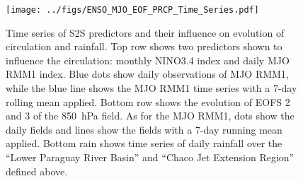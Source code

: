 \documentclass{article}
\begin{document}
\begin{figure}
  \texttt{[image: ../figs/ENSO\_MJO\_EOF\_PRCP\_Time\_Series.pdf]}
	\caption{
		Time series of S2S predictors and their influence on evolution of circulation and rainfall.
    Top row shows two predictors shown to influence the circulation: monthly NINO3.4 index and daily MJO RMM1 index.
    Blue dots show daily observations of MJO RMM1, while the blue line shows the MJO RMM1 time series with a 7-day rolling mean applied.
    Bottom row shows the evolution of EOFS 2 and 3 of the \SI{850}{\hecto\pascal} field.
    As for the MJO RMM1, dots show the daily fields and lines show the fields with a 7-day running mean applied.
    Bottom rain shows time series of daily rainfall over the ``Lower Paraguay River Basin'' and ``Chaco Jet Extension Region'' defined above.
	}
\end{figure}
\end{document}
